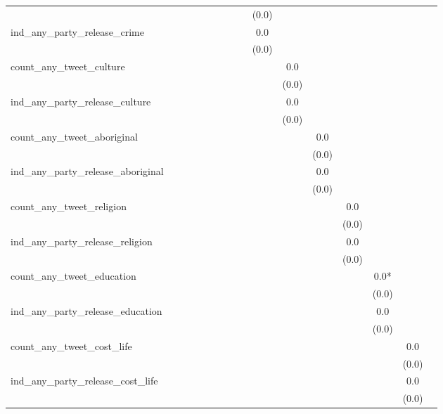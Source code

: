 \begin{table}
\begin{tabular}[t]{lccccccccccccccc}
 &  &  &  &  &  &  &  &  & (\num{0.0}) &  &  &  &  &  \vphantom{1} & \\
ind\_any\_party\_release\_crime &  &  &  &  &  &  &  &  & \num{0.0} &  &  &  &  &  & \\
 &  &  &  &  &  &  &  &  & (\num{0.0}) &  &  &  &  &  & \\
count\_any\_tweet\_culture &  &  &  &  &  &  &  &  &  & \num{0.0} &  &  &  &  & \\
 &  &  &  &  &  &  &  &  &  & (\num{0.0}) &  &  &  &  \vphantom{1} & \\
ind\_any\_party\_release\_culture &  &  &  &  &  &  &  &  &  & \num{0.0} &  &  &  &  & \\
 &  &  &  &  &  &  &  &  &  & (\num{0.0}) &  &  &  &  & \\
count\_any\_tweet\_aboriginal &  &  &  &  &  &  &  &  &  &  & \num{0.0} &  &  &  & \\
 &  &  &  &  &  &  &  &  &  &  & (\num{0.0}) &  &  &  \vphantom{1} & \\
ind\_any\_party\_release\_aboriginal &  &  &  &  &  &  &  &  &  &  & \num{0.0} &  &  &  & \\
 &  &  &  &  &  &  &  &  &  &  & (\num{0.0}) &  &  &  & \\
count\_any\_tweet\_religion &  &  &  &  &  &  &  &  &  &  &  & \num{0.0} &  &  & \\
 &  &  &  &  &  &  &  &  &  &  &  & (\num{0.0}) &  &  \vphantom{1} & \\
ind\_any\_party\_release\_religion &  &  &  &  &  &  &  &  &  &  &  & \num{0.0} &  &  & \\
 &  &  &  &  &  &  &  &  &  &  &  & (\num{0.0}) &  &  & \\
count\_any\_tweet\_education &  &  &  &  &  &  &  &  &  &  &  &  & \num{0.0}* &  & \\
 &  &  &  &  &  &  &  &  &  &  &  &  & (\num{0.0}) &  \vphantom{1} & \\
ind\_any\_party\_release\_education &  &  &  &  &  &  &  &  &  &  &  &  & \num{0.0} &  & \\
 &  &  &  &  &  &  &  &  &  &  &  &  & (\num{0.0}) &  & \\
count\_any\_tweet\_cost\_life &  &  &  &  &  &  &  &  &  &  &  &  &  & \num{0.0} & \\
 &  &  &  &  &  &  &  &  &  &  &  &  &  & (\num{0.0}) \vphantom{1} & \\
ind\_any\_party\_release\_cost\_life &  &  &  &  &  &  &  &  &  &  &  &  &  & \num{0.0} & \\
 &  &  &  &  &  &  &  &  &  &  &  &  &  & (\num{0.0}) & \\

\end{tabular}
\end{table}
